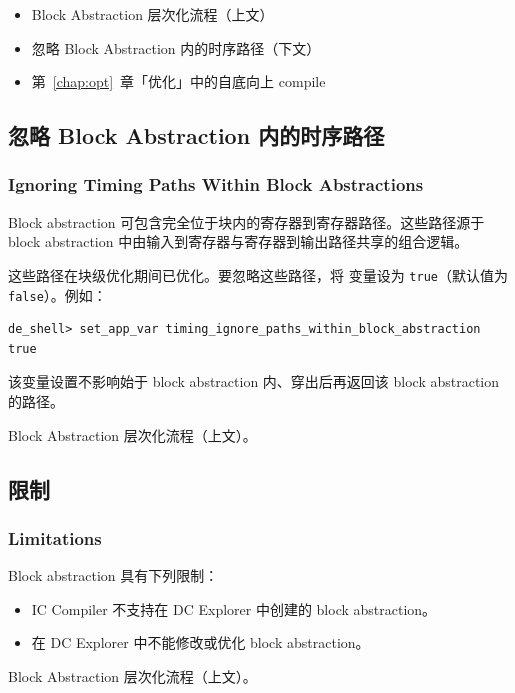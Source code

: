 \begin{seeAlsoBox}
\begin{itemize}
  \item Block Abstraction 层次化流程（上文）
  \item 忽略 Block Abstraction 内的时序路径（下文）
  \item 第~\ref{chap:opt}~章「优化」中的自底向上 compile
\end{itemize}
\end{seeAlsoBox}

\subsection{忽略 Block Abstraction 内的时序路径}
\subsubsection*{Ignoring Timing Paths Within Block Abstractions}

Block abstraction 可包含完全位于块内的寄存器到寄存器路径。这些路径源于 block abstraction 中由输入到寄存器与寄存器到输出路径共享的组合逻辑。

这些路径在块级优化期间已优化。要忽略这些路径，将  变量设为 \texttt{true}（默认值为 \texttt{false}）。例如：
\begin{lstlisting}
de_shell> set_app_var timing_ignore_paths_within_block_abstraction true
\end{lstlisting}

该变量设置不影响始于 block abstraction 内、穿出后再返回该 block abstraction 的路径。

\begin{seeAlsoBox}
Block Abstraction 层次化流程（上文）。
\end{seeAlsoBox}

\subsection{限制}
\subsubsection*{Limitations}

Block abstraction 具有下列限制：
\begin{itemize}
  \item IC Compiler 不支持在 DC Explorer 中创建的 block abstraction。
  \item 在 DC Explorer 中不能修改或优化 block abstraction。
\end{itemize}

\begin{seeAlsoBox}
Block Abstraction 层次化流程（上文）。
\end{seeAlsoBox}
